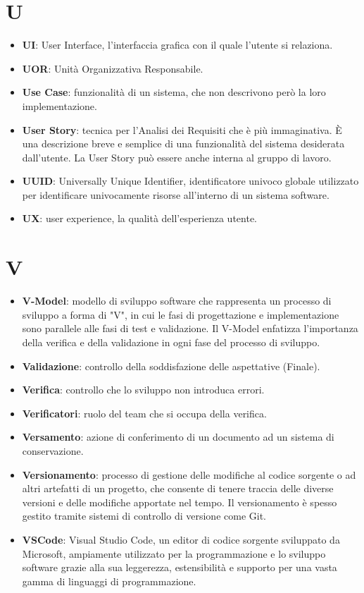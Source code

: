 \documentclass[a4paper,12pt]{article}
\begin{document}
\section{U}
\begin{itemize}
    \item \textbf{UI}: User Interface, l'interfaccia grafica con il quale l'utente si relaziona.
    \item \textbf{UOR}: Unità Organizzativa Responsabile.
    \item \textbf{Use Case}: funzionalità di un sistema, che non descrivono però la loro implementazione.
    \item \textbf{User Story}: tecnica per l'Analisi dei Requisiti che è più immaginativa. È una descrizione breve e semplice di una funzionalità del sistema desiderata dall'utente. La User Story può essere anche interna al gruppo di lavoro.
    \item \textbf{UUID}: Universally Unique Identifier, identificatore univoco globale utilizzato per identificare univocamente risorse all'interno di un sistema software.
    \item \textbf{UX}: user experience, la qualità dell'esperienza utente.
\end{itemize}
\section{V}
\begin{itemize}
    \item \textbf{V-Model}: modello di sviluppo software che rappresenta un processo di sviluppo a forma di "V", in cui le fasi di progettazione e implementazione sono parallele alle fasi di test e validazione. Il V-Model enfatizza l'importanza della verifica e della validazione in ogni fase del processo di sviluppo.
\end{itemize}
\begin{itemize}
    \item \textbf{Validazione}: controllo della soddisfazione delle aspettative (Finale).
    \item \textbf{Verifica}: controllo che lo sviluppo non introduca errori.
    \item \textbf{Verificatori}: ruolo del team che si occupa della verifica.
    \item \textbf{Versamento}: azione di conferimento di un documento ad un sistema di conservazione.
    \item \textbf{Versionamento}: processo di gestione delle modifiche al codice sorgente o ad altri artefatti di un progetto, che consente di tenere traccia delle diverse versioni e delle modifiche apportate nel tempo. Il versionamento è spesso gestito tramite sistemi di controllo di versione come Git.
    \item \textbf{VSCode}: Visual Studio Code, un editor di codice sorgente sviluppato da Microsoft, ampiamente utilizzato per la programmazione e lo sviluppo software grazie alla sua leggerezza, estensibilità e supporto per una vasta gamma di linguaggi di programmazione.
\end{itemize}
\end{document}
